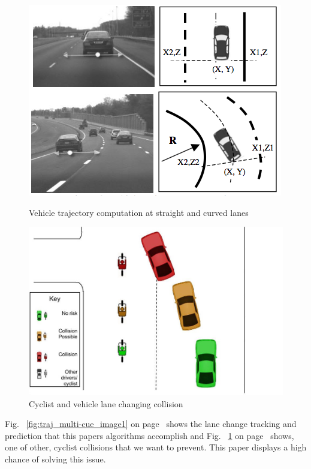 \documentclass[a4paper]{report}
\begin{document}
\begin{figure}[h]
\centering
	\begin{minipage}{0.49\textwidth}
		\centering
		\includegraphics[scale=0.4]{figures/research_paper_figures/trajectory_multi-cue}
		\caption{Vehicle trajectory computation at straight and curved lanes \citep{multi-cue} }
		\label{fig:traj_multi-cue_image1}
	\end{minipage}\hfill
	\begin{minipage}{0.49\textwidth}
		\centering
		\includegraphics[scale=0.2]{figures/collision_avoidance_figures/Vehicle_changing_lane_into_the_path_of_a_cyclist}
		\caption{Cyclist and vehicle lane changing collision}
		\label{fig:change_lane_image}
	\end{minipage}
\end{figure}

Fig. ~\ref{fig:traj_multi-cue_image1} on page~\pageref{fig:traj_multi-cue_image1} shows the lane change tracking and prediction that this papers algorithms accomplish and Fig. ~\ref{fig:change_lane_image} on page~\pageref{fig:change_lane_image} shows, one of other, cyclist collisions that we want to prevent. This paper displays a high chance of solving this issue.
\end{document}
